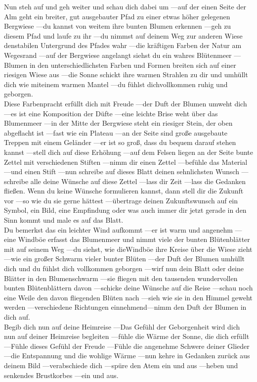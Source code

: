 Nun steh auf und geh weiter und schau dich dabei um —auf der einen Seite der Alm geht ein breiter, gut ausgebauter Pfad zu einer etwas höher gelegenen Bergwiese —du kannst von weitem ihre bunten Blumen erkennen —geh zu diesem Pfad und laufe zu ihr —du nimmst auf deinem Weg zur anderen Wiese denstabilen Untergrund des Pfades wahr —die kräftigen Farben der Natur am Wegesrand —auf der Bergwiese angelangt siehst du ein wahres Blütenmeer —Blumen in den unterschiedlichsten Farben und Formen breiten sich auf einer riesigen Wiese aus —die Sonne schickt ihre warmen Strahlen zu dir und umhüllt dich wie miteinem warmen Mantel —du fühlst dichvollkommen ruhig und geborgen.\\

Diese Farbenpracht erfüllt dich mit Freude —der Duft der Blumen umweht dich —es ist eine Komposition der Düfte —eine leichte Brise weht über das Blumenmeer —in der Mitte der Bergwiese steht ein riesiger Stein, der oben abgeflacht ist —fast wie ein Plateau —an der Seite sind große ausgebaute Treppen mit einem Geländer —er ist so groß, dass du bequem darauf stehen kannst —stell dich auf diese Erhöhung —auf dem Felsen liegen an der Seite bunte Zettel mit verschiedenen Stiften —nimm dir einen Zettel —befühle das Material —und einen Stift —nun schreibe auf dieses Blatt deinen sehnlichsten Wunsch —schreibe alle deine Wünsche auf diese Zettel —lass dir Zeit —lass die Gedanken fließen. Wenn du keine Wünsche formulieren kannst, dann stell dir die Zukunft vor —so wie du sie gerne hättest —übertrage deinen Zukunftswunsch auf ein Symbol, ein Bild, eine Empfindung oder was auch immer dir jetzt gerade in den Sinn kommt und male es auf das Blatt.\\

Du bemerkst das ein leichter Wind aufkommt —er ist warm und angenehm —eine Windböe erfasst das Blumenmeer und nimmt viele der bunten Blütenblätter mit auf seinem Weg —du siehst, wie dieWindböe ihre Kreise über die Wiese zieht —wie ein großer Schwarm vieler bunter Blüten —der Duft der Blumen umhüllt dich und du fühlst dich vollkommen geborgen —wirf nun dein Blatt oder deine Blätter in den Blumenschwarm —sie fliegen mit den tausenden wundervollen bunten Blütenblättern davon —schicke deine Wünsche auf die Reise —schau noch eine Weile den davon fliegenden Blüten nach —sieh wie sie in den Himmel geweht werden —verschiedene Richtungen einnehmend—nimm den Duft der Blumen in dich auf.\\

Begib dich nun auf deine Heimreise —Das Gefühl der Geborgenheit wird dich nun auf deiner Heimreise begleiten —fühle die Wärme der Sonne, die dich erfüllt —Fühle dieses Gefühl der Freude —Fühle die angenehme Schwere deiner Glieder —die Entspannung und die wohlige Wärme —nun kehre in Gedanken zurück aus deinem Bild —verabschiede dich —spüre den Atem ein und aus —heben und senkendes Brustkorbes —ein und aus.\\

